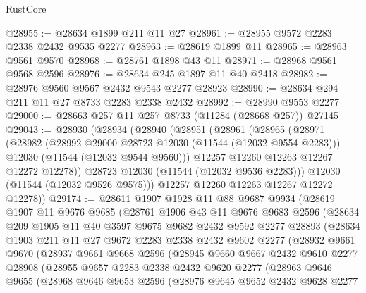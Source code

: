 \begin{lexlean}{RustCore}
\begin{coremodule}
@28955 := @28634 @1899 @211 @11 @27
@28961 := @28955 @9572 @2283 @2338 @2432 @9535 @2277
@28963 := @28619 @1899 @11
@28965 := @28963 @9561 @9570
@28968 := @28761 @1898 @43 @11
@28971 := @28968 @9561 @9568 @2596
@28976 := @28634 @245 @1897 @11 @40 @2418
@28982 := @28976 @9560 @9567 @2432 @9543 @2277 @28923
@28990 := @28634 @294 @211 @11 @27 @8733 @2283 @2338 @2432
@28992 := @28990 @9553 @2277
@29000 := @28663 @257 @11 @257 @8733 (@11284 (@28668 @257)) @27145
@29043 := @28930
    (@28934
      (@28940
        (@28951
          (@28961
            (@28965
              (@28971
                (@28982
                  (@28992 @29000 @28723 @12030 (@11544 (@12032 @9554 @2283)))
                  @12030
                  (@11544 (@12032 @9544 @9560)))
                @12257
                @12260
                @12263
                @12267
                @12272
                @12278))
            @28723
            @12030
            (@11544 (@12032 @9536 @2283)))
          @12030
          (@11544 (@12032 @9526 @9575)))
        @12257
        @12260
        @12263
        @12267
        @12272
        @12278))
@29174 := @28611
    @1907
    @1928
    @11
    @88
    @9687
    @9934
    (@28619
      @1907
      @11
      @9676
      @9685
      (@28761
        @1906
        @43
        @11
        @9676
        @9683
        @2596
        (@28634
          @209
          @1905
          @11
          @40
          @3597
          @9675
          @9682
          @2432
          @9592
          @2277
          @28893
          (@28634
            @1903
            @211
            @11
            @27
            @9672
            @2283
            @2338
            @2432
            @9602
            @2277
            (@28932
              @9661
              @9670
              (@28937
                @9661
                @9668
                @2596
                (@28945
                  @9660
                  @9667
                  @2432
                  @9610
                  @2277
                  @28908
                  (@28955
                    @9657
                    @2283
                    @2338
                    @2432
                    @9620
                    @2277
                    (@28963
                      @9646
                      @9655
                      (@28968
                        @9646
                        @9653
                        @2596
                        (@28976
                          @9645
                          @9652
                          @2432
                          @9628
                          @2277

\end{coremodule}
\end{lexlean}
